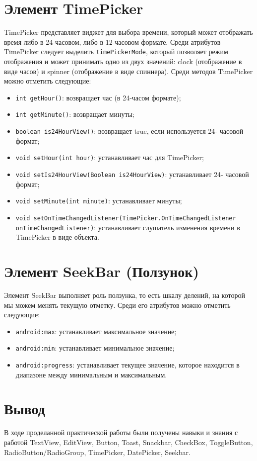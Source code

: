 \section{Элемент TimePicker}
TimePicker представляет виджет для выбора времени, который может 
отображать время либо в 24-часовом, либо в 12-часовом формате. Среди 
атрибутов TimePicker следует выделить \texttt{timePickerMode}, который позволяет 
режим отображения и может принимать одно из двух значений: clock 
(отображение в виде часов) и spinner (отображение в виде спиннера). Среди 
методов TimePicker можно отметить следующие:
\begin{itemize}
	\item \texttt{int getHour()}: возвращает час (в 24-часом формате);
	\item \texttt{int getMinute()}: возвращает минуты;
	\item \texttt{boolean is24HourView()}: возвращает true, если
		используется 24- часовой формат;
	\item \texttt{void setHour(int hour)}: устанавливает час для TimePicker;
	\item \texttt{void setIs24HourView(Boolean is24HourView)}:
		устанавливает 24- часовой формат;
	\item \texttt{void setMinute(int minute)}: устанавливает минуты;
	\item \texttt{void setOnTimeChangedListener(TimePicker.OnTimeChangedListener 
		onTimeChangedListener)}: устанавливает слушатель изменения времени 
		в TimePicker в виде объекта.
\end{itemize}

\section{Элемент SeekBar (Ползунок)}
Элемент SeekBar выполняет роль ползунка, то есть шкалу делений, на 
которой мы можем менять текущую отметку. Среди его атрибутов можно 
отметить следующие:
\begin{itemize}
	\item \texttt{android:max}: устанавливает максимальное значение;
	\item \texttt{android:min}: устанавливает минимальное значение;
	\item \texttt{android:progress}: устанавливает текущее значение,
		которое находится в диапазоне между минимальным и максимальным.
\end{itemize}

\clearpage

\section*{\LARGE{Вывод}}
В ходе проделанной практической работы были получены навыки и 
знания с работой TextView, EditView, Button, Toast, Snackbar, CheckBox, 
ToggleButton, RadioButton/RadioGroup, TimePicker, DatePicker, Seekbar.

